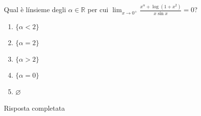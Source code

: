 \begin{quiz}
Qual \`e l\'insieme degli $\alpha\in\mathbb R$ per cui $\displaystyle\lim_{x\to0^+}\frac{x^\alpha+\log(1+x^2)}{x\sin x}=0$?
\begin{enumerate}[label=\alph*),leftmargin=1.3cm,itemsep=3pt,topsep=5pt]
\item $\{\alpha<2\}$
\item $\{\alpha=2\}$
\item $\{\alpha>2\}$
\item $\{\alpha=0\}$
\item $\varnothing$
\end{enumerate}
\end{quiz}
Risposta completata
